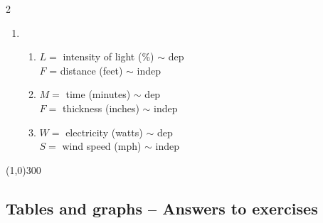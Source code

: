 \begin{multicols} {2}
\begin{enumerate}
\item 
\begin{enumerate}
\item $L=$ intensity of light (\%) $\sim$ dep \\ $F$ = distance (feet) $\sim$ indep %
\item $M=$ time (minutes) $\sim$ dep \\$F=$ thickness (inches) $\sim$ indep  %
\item $W =$ electricity (watts) $\sim$ dep \\ $S=$ wind speed (mph) $\sim$ indep %
\end{enumerate}
\end{enumerate}
\end{multicols}

\begin{center}
\line(1,0){300} %
\end{center}


\subsection{Tables and graphs -- Answers to exercises} %


